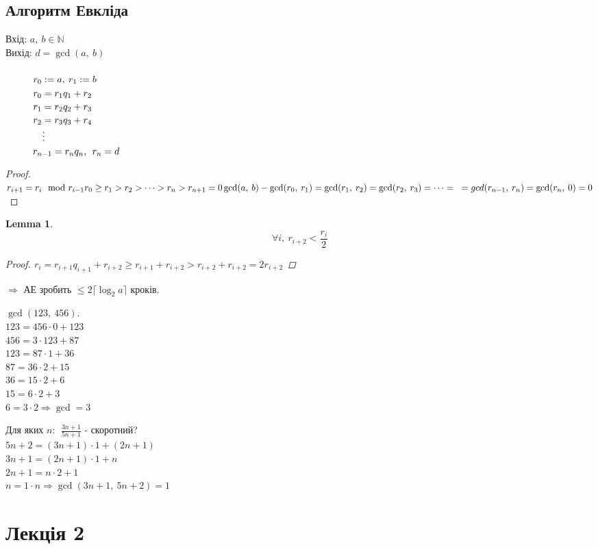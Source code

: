 \documentclass[a4paper,12pt]{bookest}
\newtheorem{lemma}[theorem]{Lemma}
\newcommand\tab[1][1cm]{\hspace*{#1}}
\begin{document}
\section{Алгоритм Евкліда}
Вхід: $a,\>b\in\mathbb{N}$\\
Вихід: $d=\gcd(a,\>b)$\\\\
$\tab r_0:=a,\>r_1:=b$\\
$\tab r_0=r_1q_1+r_2$\\
$\tab r_1=r_2q_2+r_3$\\
$\tab r_2=r_3q_3+r_4$\\
$\tab\quad\vdots$\\
$\tab r_{n-1}=r_nq_n,\>\>r_n=d$
\begin{proof}
	$r_{i+1}=r_{i}\mod r_{i-1}\\ r_0\geq r_1>r_2>\dots>r_{n}>r_{n+1}=0\\\gcd(a,\>b)-\gcd(r_0,\>r_1)=\gcd(r_1,\>r_2)=\gcd(r_2,\>r_3)=\dots=\\\ =gcd(r_{n-1},\>r_n)=\gcd(r_n,\>0)=0$
\end{proof}
\begin{lemma}
	$$\forall i,\>r_{i+2}<\frac{r_i}{2}$$
	\begin{proof}
		$r_i=r_{i+1}q_{i+1}+r_{i+2}\geq r_{i+1}+r_{i+2}>r_{i+2}+r_{i+2}=2r_{i+2}$
	\end{proof}
\end{lemma}
$\Rightarrow$ АЕ зробить $\leq2\lceil\log_2a\rceil$ кроків.
\begin{example}
	$\gcd(123,\>456).$\\
	$123=456\cdot 0+123$\\
	$456=3\cdot 123+87$\\
	$123=87\cdot 1+36$\\
	$87=36\cdot 2+15$\\
	$36=15\cdot 2+6$\\
	$15=6\cdot 2+3$\\
	$6=3\cdot2\Rightarrow \gcd = 3$
\end{example}
\begin{example}
	Для яких $n:\>\>\frac{3n+1}{5n+1}$ - скоротний?\\
	$5n+2=(3n+1)\cdot 1+(2n+1)$\\
	$3n+1=(2n+1)\cdot 1+n$\\
	$2n+1=n\cdot 2+1$\\
	$n=1\cdot n\Rightarrow\gcd(3n+1,\>5n+2)=1$
\end{example}
\chapter{Лекція 2}
\end{document}
